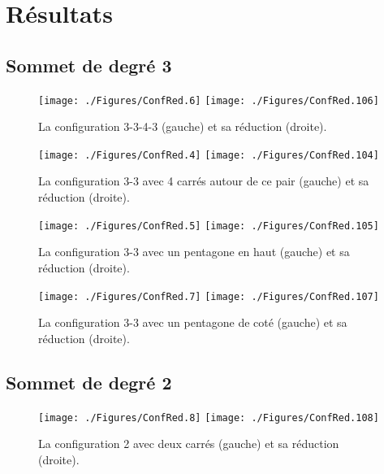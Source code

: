 \documentclass{beamer}
\begin{document}
\section{Résultats}
\subsection{Sommet de degré 3}
\begin{frame}
\begin{figure}[ht]
\centerline{
\texttt{[image: ./Figures/ConfRed.6]}
\hfil
\texttt{[image: ./Figures/ConfRed.106]}
}
\caption{La configuration 3-3-4-3 (gauche) et sa réduction (droite).}
\end{figure}
\end{frame}

\begin{frame}
\begin{figure}[ht]
\centerline{
\texttt{[image: ./Figures/ConfRed.4]}
\hfil
\texttt{[image: ./Figures/ConfRed.104]}
}
\caption{La configuration 3-3 avec 4 carrés autour de ce pair (gauche) et sa réduction (droite).}
\end{figure}
\end{frame}

\begin{frame}
\begin{figure}[ht]
\centerline{
\texttt{[image: ./Figures/ConfRed.5]}
\hfil
\texttt{[image: ./Figures/ConfRed.105]}
}
\caption{La configuration 3-3 avec un pentagone en haut (gauche) et sa réduction (droite).}
\label{fig:33PH}
\end{figure}
\end{frame}

\begin{frame}
\begin{figure}[ht]
\centerline{
\texttt{[image: ./Figures/ConfRed.7]}
\hfil
\texttt{[image: ./Figures/ConfRed.107]}
}
\caption{La configuration 3-3 avec un pentagone de coté (gauche) et sa réduction (droite).}
\label{fig:33PC}
\end{figure}
\end{frame}

\subsection{Sommet de degré 2}
\begin{frame}
\begin{figure}[ht]
\centerline{
\texttt{[image: ./Figures/ConfRed.8]}
\hfil
\texttt{[image: ./Figures/ConfRed.108]}
}
\caption{La configuration 2 avec deux carrés (gauche) et sa réduction (droite).}
\label{fig:2CC}
\end{figure}
\end{frame}
\end{document}
